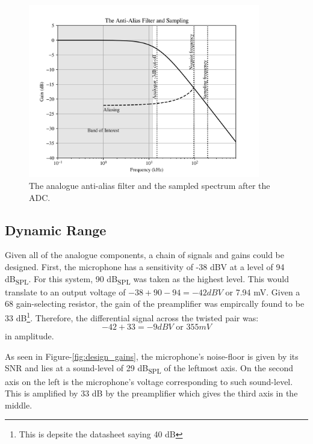\documentclass[notitlepage]{report}
\begin{document}
\begin{figure}[H]
\includegraphics[width=0.9\textwidth]{../Python/report/spectrum.png}
\centering
\caption{The analogue anti-alias filter and the sampled spectrum after the ADC.}
\label{fig:design_spectrum}
\centering
\end{figure}

\subsection{Dynamic Range}

Given all of the analogue components, a chain of signals and gains could be designed. First, the microphone has a sensitivity of -38 \si{dBV} at a level of 94 \si{dB_{SPL}}. For this system, 90 \si{dB_{SPL}} was taken as the highest level. This would translate to an output voltage of $-38 + 90 - 94 = -42 \si{dBV}$ or 7.94 \si{mV}. Given a 68 \si{\Omega} gain-selecting resistor, the gain of the preamplifier was empircally found to be 33 \si{dB}\footnote{This is depsite the datasheet saying 40 \si{dB}}. Therefore, the differential signal across the twisted pair was:
\begin{equation}
-42 + 33 = -9 \si{dBV} \text{ or } 355 \si{mV}
\end{equation}
in amplitude.

As seen in Figure-\ref{fig:design_gains}, the microphone's noise-floor is given by its SNR and lies at a sound-level of 29 \si{dB_{SPL}} of the leftmost axis. On the second axis on the left is the microphone's voltage corresponding to such sound-level. This is amplified by 33 \si{dB} by the preamplifier which gives the third axis in the middle.
\end{document}
